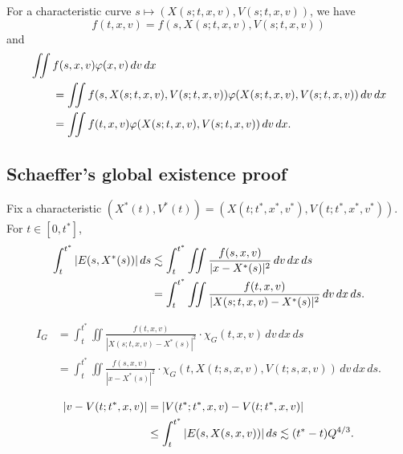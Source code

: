 \documentclass[11pt]{article}
\begin{document}
For a characteristic curve $s\mapsto(X(s;t,x,v),V(s;t,x,v))$, we have
\[f(t,x,v)=f(s,X(s;t,x,v),V(s;t,x,v))\]
and
\begin{align*}
&\iint f(s,x,v)\varphi(x,v)\,dv\,dx\\
&\qquad=\iint f(s,X(s;t,x,v),V(s;t,x,v))\varphi(X(s;t,x,v),V(s;t,x,v))\,dv\,dx\\
&\qquad=\iint f(t,x,v)\varphi(X(s;t,x,v),V(s;t,x,v))\,dv\,dx.
\end{align*}



\subsection{Schaeffer's global existence proof}


Fix a characteristic $(X^*(t),V^*(t))=(X(t;t^*,x^*,v^*),V(t;t^*,x^*,v^*))$.
For $t\in[0,t^*]$,
\begin{align*}
\int_t^{t^*}|E(s,X^*(s))|\,ds
&\lesssim\int_t^{t^*}\iint\frac{f(s,x,v)}{|x-X^*(s)|^2}\,dv\,dx\,ds\\
&=\int_t^{t^*}\iint\frac{f(t,x,v)}{|X(s;t,x,v)-X^*(s)|^2}\,dv\,dx\,ds.
\end{align*}


\begin{align*}
I_G&=\int_t^{t^*}\iint\frac{f(t,x,v)}{|X(s;t,x,v)-X^*(s)|^2}\cdot\chi_G(t,x,v)\,dv\,dx\,ds\\
&=\int_t^{t^*}\iint\frac{f(s,x,v)}{|x-X^*(s)|^2}\cdot\chi_G(t,X(t;s,x,v),V(t;s,x,v))\,dv\,dx\,ds.
\end{align*}


\begin{align*}
|v-V(t;t^*,x,v)|
&=|V(t^*;t^*,x,v)-V(t;t^*,x,v)|\\
&\le\int_t^{t^*}|E(s,X(s,x,v))|\,ds
\lesssim(t^*-t)Q^{4/3}.
\end{align*}
\end{document}
